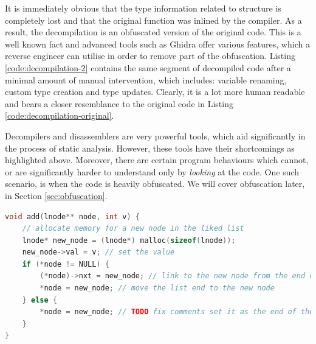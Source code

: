 It is immediately obvious that the type information related to  structure is completely lost and that the original function was inlined by the compiler. As a result, the decompilation is an obfuscated version of the original code. This is a well known fact and advanced tools such as Ghidra offer various features, which a reverse engineer can utilise in order to remove part of the obfuscation. Listing \ref{code:decompilation-2} contains the same segment of decompiled code after a minimal amount of manual intervention, which includes: variable renaming, custom type creation and type updates. Clearly, it is a lot more human readable and bears a closer resemblance to the original code in Listing \ref{code:decompilation-original}. 

Decompilers and disassemblers are very powerful tools, which aid significantly in the process of static analysis. However, these tools have their shortcomings as highlighted above. Moreover, there are certain program behaviours which cannot, or are significantly harder to understand only by \emph{looking} at the code. One such scenario, is when the code is heavily obfuscated. We will cover obfuscation later, in Section \ref{sec:obfuscation}.

\begin{lstlisting}[language=c, label={code:decompilation-original}, caption={A function which adds an integer value \cc{v} to the end of a linked list.}]
void add(lnode** node, int v) {
    // allocate memory for a new node in the liked list
    lnode* new_node = (lnode*) malloc(sizeof(lnode));
    new_node->val = v; // set the value
    if (*node != NULL) {
        (*node)->nxt = new_node; // link to the new node from the end of the list
        *node = new_node; // move the list end to the new node
    } else {
        *node = new_node; // TODO fix comments set it as the end of the list, it it is the first one
    }
}
\end{lstlisting}

